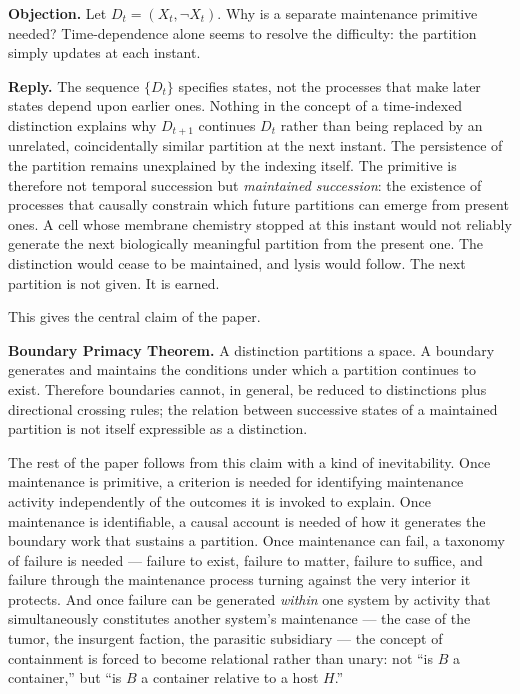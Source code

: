 \documentclass[11pt]{article}
\theoremstyle{plain}
\begin{document}
\textbf{Objection.} Let \(D_t = (X_t, \neg X_t)\). Why is a separate maintenance primitive needed? Time-dependence alone seems to resolve the difficulty: the partition simply updates at each instant.

\textbf{Reply.} The sequence \(\{D_t\}\) specifies states, not the processes that make later states depend upon earlier ones. Nothing in the concept of a time-indexed distinction explains why \(D_{t+1}\) continues \(D_t\) rather than being replaced by an unrelated, coincidentally similar partition at the next instant. The persistence of the partition remains unexplained by the indexing itself. The primitive is therefore not temporal succession but \emph{maintained succession}: the existence of processes that causally constrain which future partitions can emerge from present ones. A cell whose membrane chemistry stopped at this instant would not reliably generate the next biologically meaningful partition from the present one. The distinction would cease to be maintained, and lysis would follow. The next partition is not given. It is earned.

This gives the central claim of the paper.

\textbf{Boundary Primacy Theorem.} A distinction partitions a space. A boundary generates and maintains the conditions under which a partition continues to exist. Therefore boundaries cannot, in general, be reduced to distinctions plus directional crossing rules; the relation between successive states of a maintained partition is not itself expressible as a distinction.

The rest of the paper follows from this claim with a kind of inevitability. Once maintenance is primitive, a criterion is needed for identifying maintenance activity independently of the outcomes it is invoked to explain. Once maintenance is identifiable, a causal account is needed of how it generates the boundary work that sustains a partition. Once maintenance can fail, a taxonomy of failure is needed --- failure to exist, failure to matter, failure to suffice, and failure through the maintenance process turning against the very interior it protects. And once failure can be generated \emph{within} one system by activity that simultaneously constitutes another system's maintenance --- the case of the tumor, the insurgent faction, the parasitic subsidiary --- the concept of containment is forced to become relational rather than unary: not ``is \(B\) a container,'' but ``is \(B\) a container relative to a host \(H\).''
\end{document}
